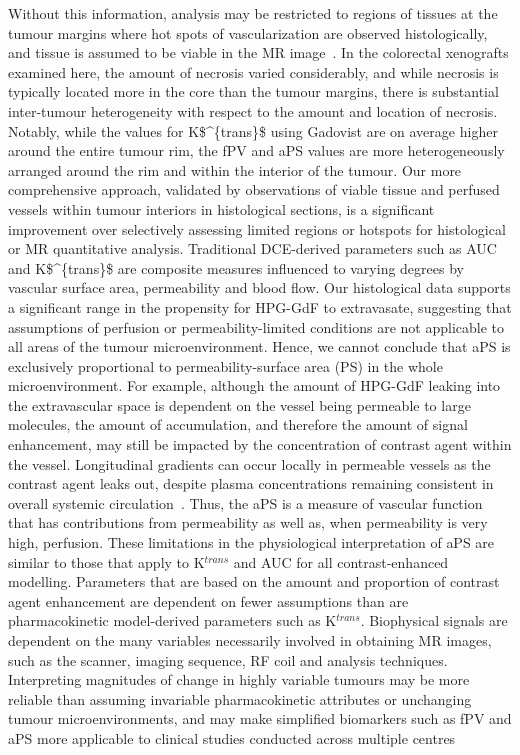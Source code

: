 Without this information, analysis may be restricted to regions of tissues at the tumour margins where hot spots of vascularization are observed histologically, and tissue is assumed to be viable in the MR image~\cite{Pathak:2005gu,Li:2005gw}.
In the colorectal xenografts examined here, the amount of necrosis varied considerably, and while necrosis is typically located more in the core than the tumour margins, there is substantial inter-tumour heterogeneity with respect to the amount and location of necrosis.
Notably, while the values for \acs{K$^{trans}$} using Gadovist are on average higher around the entire tumour rim, the \acs{fPV} and \acs{aPS} values are more heterogeneously arranged around the rim and within the interior of the tumour.
Our more comprehensive approach, validated by observations of viable tissue and perfused vessels within tumour interiors in histological sections, is a significant improvement over selectively assessing limited regions or hotspots for histological or MR quantitative analysis.
Traditional DCE-derived parameters such as \acs{AUC} and \acs{K$^{trans}$} are composite measures influenced to varying degrees by vascular surface area, permeability and blood flow.
Our histological data supports a significant range in the propensity for \acs{HPG-GdF} to extravasate, suggesting that assumptions of perfusion or permeability-limited conditions are not applicable to all areas of the tumour microenvironment.
Hence, we cannot conclude that \acs{aPS} is exclusively proportional to permeability-surface area (PS) in the whole microenvironment.
For example, although the amount of \acs{HPG-GdF} leaking into the extravascular space is dependent on the vessel being permeable to large molecules, the amount of accumulation, and therefore the amount of signal enhancement, may still be impacted by the concentration of contrast agent within the vessel.
Longitudinal gradients can occur locally in permeable vessels as the contrast agent leaks out, despite plasma concentrations remaining consistent in overall systemic circulation~\cite{Erickson:2003wt,Dewhirst:1999jh}.
Thus, the \acs{aPS} is a measure of vascular function that has contributions from permeability as well as, when permeability is very high, perfusion.
These limitations in the physiological interpretation of \acs{aPS} are similar to those that apply to K$^{trans}$ and \acs{AUC} for all contrast-enhanced modelling.
Parameters that are based on the amount and proportion of contrast agent enhancement are dependent on fewer assumptions than are pharmacokinetic model-derived parameters such as K$^{trans}$.
Biophysical signals are dependent on the many variables necessarily involved in obtaining MR images, such as the scanner, imaging sequence, RF coil and analysis techniques.
Interpreting magnitudes of change in highly variable tumours may be more reliable than assuming invariable pharmacokinetic attributes or unchanging tumour microenvironments, and may make simplified biomarkers such as \acs{fPV} and \acs{aPS} more applicable to clinical studies conducted across multiple centres~\cite{OConnor:2012ie}

